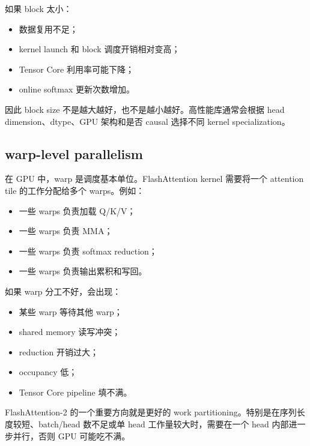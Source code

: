 如果 block 太小：

\begin{itemize}
\item 数据复用不足；
\item kernel launch 和 block 调度开销相对变高；
\item Tensor Core 利用率可能下降；
\item online softmax 更新次数增加。
\end{itemize}

因此 block size 不是越大越好，也不是越小越好。高性能库通常会根据 head dimension、dtype、GPU 架构和是否 causal 选择不同 kernel specialization。

\subsection{warp-level parallelism}
\label{subsec:warp-level-parallelism}

在 GPU 中，warp 是调度基本单位。FlashAttention kernel 需要将一个 attention tile 的工作分配给多个 warps。例如：

\begin{itemize}
\item 一些 warps 负责加载 Q/K/V；
\item 一些 warps 负责 MMA；
\item 一些 warps 负责 softmax reduction；
\item 一些 warps 负责输出累积和写回。
\end{itemize}

如果 warp 分工不好，会出现：

\begin{itemize}
\item 某些 warp 等待其他 warp；
\item shared memory 读写冲突；
\item reduction 开销过大；
\item occupancy 低；
\item Tensor Core pipeline 填不满。
\end{itemize}

FlashAttention-2 的一个重要方向就是更好的 work partitioning。特别是在序列长度较短、batch/head 数不足或单 head 工作量较大时，需要在一个 head 内部进一步并行，否则 GPU 可能吃不满。

